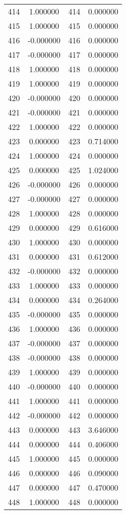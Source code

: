 \documentclass[12pt]{article}
\begin{document}
\begin{longtable}{@{}cccc@{}}
414 & 1.000000 & 414 & 0.000000 \\
415 & 1.000000 & 415 & 0.000000 \\
416 & -0.000000 & 416 & 0.000000 \\
417 & -0.000000 & 417 & 0.000000 \\
418 & 1.000000 & 418 & 0.000000 \\
419 & 1.000000 & 419 & 0.000000 \\
420 & -0.000000 & 420 & 0.000000 \\
421 & -0.000000 & 421 & 0.000000 \\
422 & 1.000000 & 422 & 0.000000 \\
423 & 0.000000 & 423 & 0.714000 \\
424 & 1.000000 & 424 & 0.000000 \\
425 & 0.000000 & 425 & 1.024000 \\
426 & -0.000000 & 426 & 0.000000 \\
427 & -0.000000 & 427 & 0.000000 \\
428 & 1.000000 & 428 & 0.000000 \\
429 & 0.000000 & 429 & 0.616000 \\
430 & 1.000000 & 430 & 0.000000 \\
431 & 0.000000 & 431 & 0.612000 \\
432 & -0.000000 & 432 & 0.000000 \\
433 & 1.000000 & 433 & 0.000000 \\
434 & 0.000000 & 434 & 0.264000 \\
435 & -0.000000 & 435 & 0.000000 \\
436 & 1.000000 & 436 & 0.000000 \\
437 & -0.000000 & 437 & 0.000000 \\
438 & -0.000000 & 438 & 0.000000 \\
439 & 1.000000 & 439 & 0.000000 \\
440 & -0.000000 & 440 & 0.000000 \\
441 & 1.000000 & 441 & 0.000000 \\
442 & -0.000000 & 442 & 0.000000 \\
443 & 0.000000 & 443 & 3.646000 \\
444 & 0.000000 & 444 & 0.406000 \\
445 & 1.000000 & 445 & 0.000000 \\
446 & 0.000000 & 446 & 0.090000 \\
447 & 0.000000 & 447 & 0.470000 \\
448 & 1.000000 & 448 & 0.000000 \\

\end{longtable}
\end{document}
